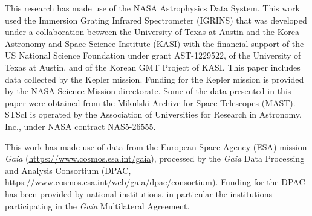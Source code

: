 \documentclass[trackchanges]{aastex631}
\begin{document}
\clearpage
\pagebreak



\begin{acknowledgements}

This research has made use of the NASA Astrophysics Data System.
This work used the Immersion Grating Infrared Spectrometer (IGRINS) that was developed under a collaboration between the University of Texas at Austin and the Korea Astronomy and Space Science Institute (KASI) with the financial support of the US National Science Foundation under grant AST-1229522, of the University of Texas at Austin, and of the Korean GMT Project of KASI.
This paper includes data collected by the Kepler mission. Funding for the Kepler mission is provided by the NASA Science Mission directorate.
Some of the data presented in this paper were obtained from the Mikulski Archive for Space Telescopes (MAST). STScI is operated by the Association of Universities for Research in Astronomy, Inc., under NASA contract NAS5-26555.

This work has made use of data from the European Space Agency (ESA) mission
{\it Gaia} (\url{https://www.cosmos.esa.int/gaia}), processed by the {\it Gaia}
Data Processing and Analysis Consortium (DPAC,
\url{https://www.cosmos.esa.int/web/gaia/dpac/consortium}). Funding for the DPAC
has been provided by national institutions, in particular the institutions
participating in the {\it Gaia} Multilateral Agreement.

\end{acknowledgements}



\clearpage


\end{document}
